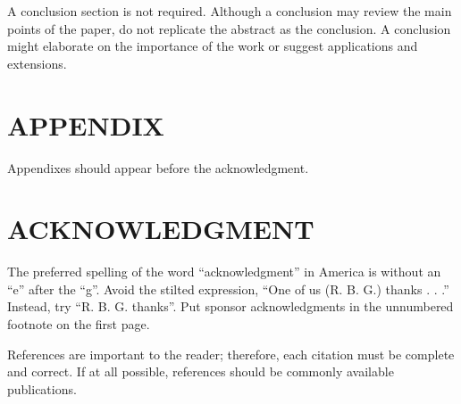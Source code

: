 \documentclass[letterpaper, 10 pt, conference]{ieeeconf}  %
\begin{document}
A conclusion section is not required. Although a conclusion may review the main points of the paper, do not replicate the abstract as the conclusion. A conclusion might elaborate on the importance of the work or suggest applications and extensions. 

\addtolength{\textheight}{-12cm}   %







\section*{APPENDIX}

Appendixes should appear before the acknowledgment.

\section*{ACKNOWLEDGMENT}

The preferred spelling of the word ``acknowledgment'' in America is without an ``e'' after the ``g''. Avoid the stilted expression, ``One of us (R. B. G.) thanks . . .''  Instead, try ``R. B. G. thanks''. Put sponsor acknowledgments in the unnumbered footnote on the first page.




References are important to the reader; therefore, each citation must be complete and correct. If at all possible, references should be commonly available publications.
\end{document}
